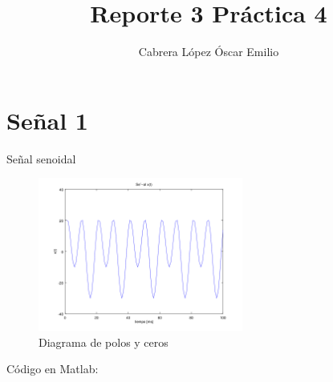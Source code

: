 \documentclass[a4paper,11pt]{report}
\title{Reporte 3 Práctica 4}
\author{Cabrera López Óscar Emilio}
\begin{document}
\thispagestyle{fancy}
\maketitle
\tableofcontents
\newpage
\setcounter{chapter}{1}

\section{Señal 1}
Señal senoidal
  \begin{figure}[H]
    \begin{center}
      \includegraphics[width=0.6\textwidth]{./senal1}
      \caption{Diagrama de polos y ceros}
    \end{center}
  \end{figure}
  Código en Matlab:
  
\end{document}

